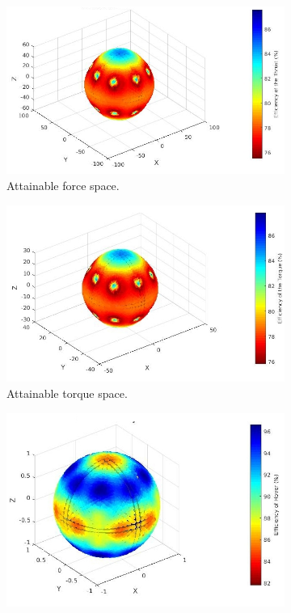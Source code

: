 \begin{figure}[!ht]
  \begin{center}
  \begin{subfigure}[b]{0.47\textwidth}
    \includegraphics[width=\linewidth]{images/Octa_fspace.jpg}
    \caption{Attainable force space.} \label{fig:Octa_fspace}
  \end{subfigure}
  \hspace*{\fill} %
  \begin{subfigure}[b]{0.45\textwidth}
    \includegraphics[width=\linewidth]{images/Octa_tspace.jpg}
    \caption{Attainable torque space.} \label{fig:Octa_tspace}
  \end{subfigure}
  \begin{subfigure}[b]{0.45\textwidth}
    \includegraphics[width=\linewidth]{images/Octa_hspace.jpg}

\end{subfigure}
\end{center}
\end{figure}
